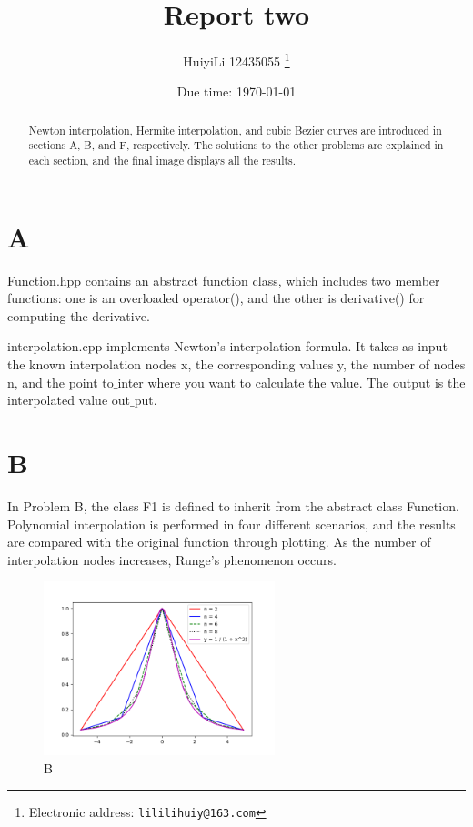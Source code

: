 \documentclass[a4paper]{article}
\begin{document}
\title{Report two}

\author{HuiyiLi 12435055
  \thanks{Electronic address: \texttt{lililihuiy@163.com}}}


\date{Due time: \today}

\maketitle
 \begin{abstract}
  Newton interpolation, Hermite interpolation, and cubic Bezier curves are introduced in sections A, B, and F, respectively. The solutions to the other problems are explained in each section, and the final image displays all the results.
\end{abstract} 


\section{A}
Function.hpp contains an abstract function class, which includes two member functions: one is an overloaded  operator(), and the other is derivative() for computing the derivative.

interpolation.cpp implements Newton's interpolation formula. It takes as input the known interpolation nodes x, the corresponding values y, the number of nodes n,
and the point to$\_$inter where you want to calculate the value. The output is the interpolated value out$\_$put.

\section{B}
In Problem B, the class F1 is defined to inherit from the abstract class Function. Polynomial interpolation is performed in four different scenarios, 
and the results are compared with the original function through plotting. As the number of interpolation nodes increases, Runge's phenomenon occurs.
\begin{figure}[htbp]
  \centering
  \includegraphics[width=0.6\textwidth]{pic/B.png}
  \caption{B}
  \label{B}
\end{figure}
\end{document}
